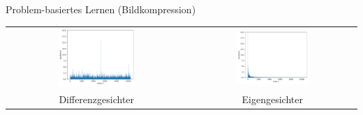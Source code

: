 \documentclass[10pt,aspectratio=169]{beamer}
\begin{document}
\begin{frame}[fragile]{Problem-basiertes Lernen (Bildkompression)}
\begin{tabular}{cc}
		\centering
		\includegraphics[width=0.45\textwidth]{images/eigenfaces/naive_coef} &
		\includegraphics[width=0.45\textwidth]{images/eigenfaces/eigen_coef} \\
		\phantom{text}Differenzgesichter & \phantom{text}Eigengesichter
	\end{tabular}
\end{frame}
\end{document}
